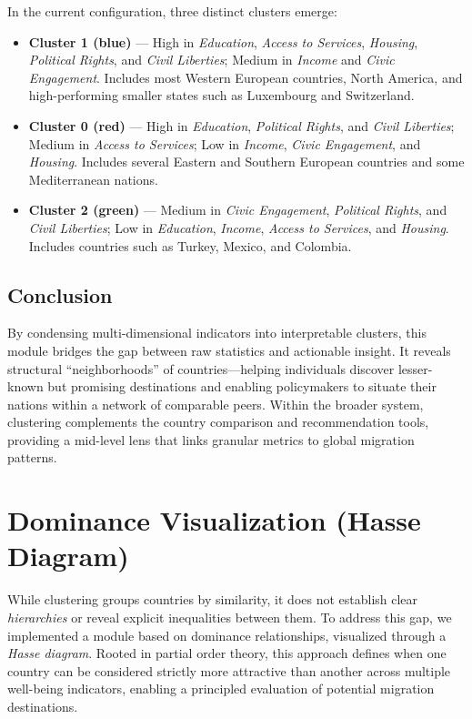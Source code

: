 \documentclass[11pt]{article}
\begin{document}
\noindent
In the current configuration, three distinct clusters emerge:
\begin{itemize}
    \item \textbf{Cluster 1 (blue)} — High in \emph{Education}, \emph{Access to Services}, \emph{Housing}, \emph{Political Rights}, and \emph{Civil Liberties}; Medium in \emph{Income} and \emph{Civic Engagement}. Includes most Western European countries, North America, and high-performing smaller states such as Luxembourg and Switzerland.
    \item \textbf{Cluster 0 (red)} — High in \emph{Education}, \emph{Political Rights}, and \emph{Civil Liberties}; Medium in \emph{Access to Services}; Low in \emph{Income}, \emph{Civic Engagement}, and \emph{Housing}. Includes several Eastern and Southern European countries and some Mediterranean nations.
    \item \textbf{Cluster 2 (green)} — Medium in \emph{Civic Engagement}, \emph{Political Rights}, and \emph{Civil Liberties}; Low in \emph{Education}, \emph{Income}, \emph{Access to Services}, and \emph{Housing}. Includes countries such as Turkey, Mexico, and Colombia.
\end{itemize}

\subsection{Conclusion}
\noindent
By condensing multi-dimensional indicators into interpretable clusters, this module bridges the gap between raw statistics and actionable insight. It reveals structural ``neighborhoods'' of countries—helping individuals discover lesser-known but promising destinations and enabling policymakers to situate their nations within a network of comparable peers. Within the broader system, clustering complements the country comparison and recommendation tools, providing a mid-level lens that links granular metrics to global migration patterns.




\newpage

\section{Dominance Visualization (Hasse Diagram)}

\noindent
While clustering groups countries by similarity, it does not establish clear \textit{hierarchies} or reveal explicit inequalities between them. To address this gap, we implemented a module based on dominance relationships, visualized through a \textit{Hasse diagram}.  
Rooted in partial order theory, this approach defines when one country can be considered strictly more attractive than another across multiple well-being indicators, enabling a principled evaluation of potential migration destinations.
\end{document}
